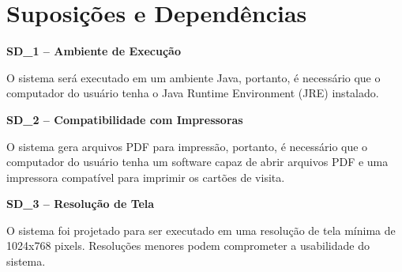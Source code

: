\section{Suposições e Dependências}

\textbf{SD\_1 – Ambiente de Execução}

O sistema será executado em um ambiente Java, portanto, é necessário que o computador do usuário tenha o Java Runtime Environment (JRE) instalado.

\textbf{SD\_2 – Compatibilidade com Impressoras}

O sistema gera arquivos PDF para impressão, portanto, é necessário que o computador do usuário tenha um software capaz de abrir arquivos PDF e uma impressora compatível para imprimir os cartões de visita.

\textbf{SD\_3 – Resolução de Tela}

O sistema foi projetado para ser executado em uma resolução de tela mínima de 1024x768 pixels. Resoluções menores podem comprometer a usabilidade do sistema.
